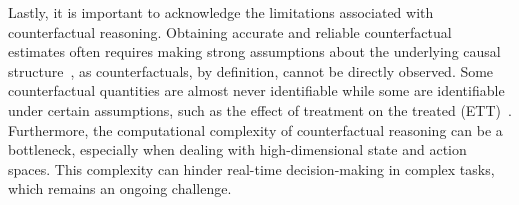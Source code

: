 \documentclass[10pt]{article} %
\theoremstyle{definition}
\begin{document}
Lastly, it is important to acknowledge the limitations associated with counterfactual reasoning. Obtaining accurate and reliable counterfactual estimates often requires making strong assumptions about the underlying causal structure~\citep{shpitserWhatCounterfactualsCan2007,correaNestedCounterfactualIdentification2021,zhangPartialCounterfactualIdentification2022}, as counterfactuals, by definition, cannot be directly observed. Some counterfactual quantities are almost never identifiable while some are identifiable under certain assumptions, such as the effect of treatment on the treated (ETT)~\citep[Chapter~11]{pearlCausality2009}. Furthermore, the computational complexity of counterfactual reasoning can be a bottleneck, especially when dealing with high-dimensional state and action spaces. This complexity can hinder real-time decision-making in complex tasks, which remains an ongoing challenge.
\end{document}
